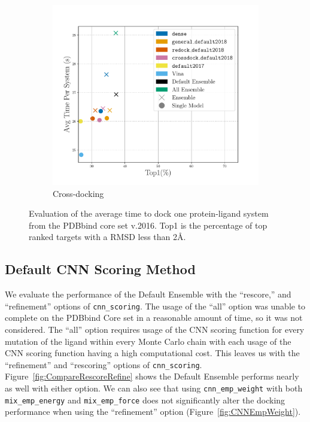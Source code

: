\documentclass[journal=jcisd8,manuscript=article]{achemso}
\begin{document}
\begin{figure}
\begin{subfigure}[b]{0.48\textwidth}
                \includegraphics[width=\textwidth]{figures/crossdocking/gpu_models_line_rescore.pdf}
                \caption{Cross-docking}
                \label{fig:OptimalRescCD}
        \end{subfigure}    
        \caption{Evaluation of the average time to dock one protein-ligand system from the PDBbind core set v.2016. Top1 is the percentage of top ranked targets with a RMSD less than 2{\AA}.}
        \label{fig:OptimalRescore}
\end{figure}    

\subsection{Default CNN Scoring Method}
 We evaluate the performance of the Default Ensemble with the ``rescore,'' and ``refinement'' options of \texttt{cnn\_scoring}. The usage of the ``all'' option was unable to complete on the PDBbind Core set in a reasonable amount of time, so it was not considered. The ``all'' option requires usage of the CNN scoring function for every mutation of the ligand within every Monte Carlo chain with each usage of the CNN scoring function having a high computational cost. This leaves us with the ``refinement'' and ``rescoring'' options of \texttt{cnn\_scoring}. Figure~\ref{fig:CompareRescoreRefine} shows the Default Ensemble performs nearly as well with either option. We can also see that using \texttt{cnn\_emp\_weight} with both \texttt{mix\_emp\_energy} and \texttt{mix\_emp\_force} does not significantly alter the docking performance when using the ``refinement'' option (Figure~\ref{fig:CNNEmpWeight}).
\end{document}
